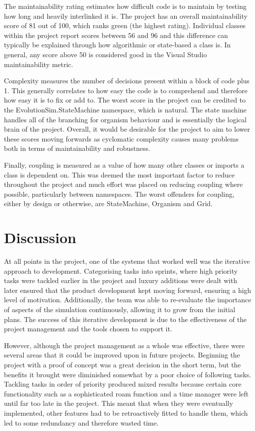 \documentclass[a4paper, oneside, 11pt]{report}
\begin{document}
The maintainability rating estimates how difficult code is to maintain by testing how long and heavily interlinked it is. The project has an overall maintainability score of 81 out of 100, which ranks green (the highest rating). Individual classes within the project report scores between 56 and 96 and this difference can typically be explained through how algorithmic or state-based a class is. In general, any score above 50 is considered good in the Visual Studio maintainability metric.

Complexity measures the number of decisions present within a block of code plus 1. This generally correlates to how easy the code is to comprehend and therefore how easy it is to fix or add to. The worst score in the project can be credited to the EvolutionSim.StateMachine namespace, which is natural. The state machine handles all of the branching for organism behaviour and is essentially the logical brain of the project. Overall, it would be desirable for the project to aim to lower these scores moving forwards as cyclomatic complexity causes many problems both in terms of maintainability and robustness.

Finally, coupling is measured as a value of how many other classes or imports a class is dependent on. This was deemed the most important factor to reduce throughout the project and much effort was placed on reducing coupling where possible, particularly between namespaces. The worst offenders for coupling, either by design or otherwise, are StateMachine, Organism and Grid. 

\chapter{Discussion}\label{discussion}
At all points in the project, one of the systems that worked well was the iterative approach to development. Categorising tasks into sprints, where high priority tasks were tackled earlier in the project and luxury additions were dealt with later ensured that the product development kept moving forward, ensuring a high level of motivation. Additionally, the team was able to re-evaluate the importance of aspects of the simulation continuously, allowing it to grow from the initial plans. The success of this iterative development is due to the effectiveness of the project management and the tools chosen to support it.

However, although the project management as a whole was effective, there were several areas that it could be improved upon in future projects. Beginning the project with a proof of concept was a great decision in the short term, but the benefits it brought were diminished somewhat by a poor choice of following tasks. Tackling tasks in order of priority produced mixed results because certain core functionality such as a sophisticated roam function and a time manager were left until far too late in the project. This meant that when they were eventually implemented, other features had to be retroactively fitted to handle them, which led to some redundancy and therefore wasted time.
\end{document}
